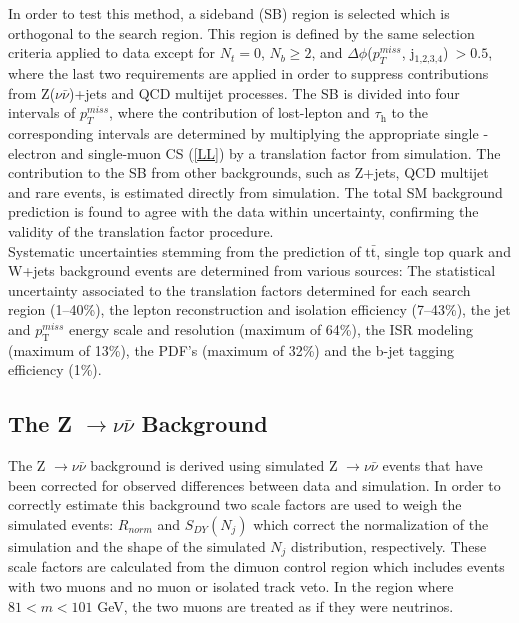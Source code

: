 In order to test this method, a sideband (SB) region is selected which is orthogonal to the search region. This region is defined by the same selection criteria applied to data except for $N_t = 0$, $N_b \geq 2$, and $\Delta\phi$($p_{T}^{miss}$,  j$_\text{1,2,3,4}$)$~> 0.5$, where the last two requirements are applied in order to suppress contributions from Z($\nu\bar{\nu}$)+jets and QCD multijet processes. The SB is divided into four intervals of $p_{T}^{miss}$, where the contribution of lost-lepton and $\tau_\text{h}$ to the corresponding intervals are determined by multiplying the appropriate single -electron and single-muon CS (\autoref{LL}) by a translation factor from simulation. The contribution to the SB from other backgrounds, such as Z+jets, QCD multijet and rare events, is estimated directly from simulation. The total SM background prediction is found to agree with the data within uncertainty, confirming the validity of the translation factor procedure.\\

Systematic uncertainties stemming from the prediction of t$\bar{\text{t}}$, single top quark and W+jets background events are determined from various sources: The statistical uncertainty associated to the translation factors determined for each search region (1--40\%), the lepton reconstruction and isolation efficiency (7--43\%), the jet and $p_{\text{T}}^{miss}$ energy scale and resolution (maximum of 64\%), the ISR modeling (maximum of 13\%), the PDF's (maximum of 32\%) and the b-jet tagging efficiency (1\%).

\subsection{The Z $\rightarrow\nu\bar{\nu}$ Background}\label{ZnunuSection}

The Z $\rightarrow\nu\bar{\nu}$ background is derived using simulated Z $\rightarrow\nu\bar{\nu}$ events that have been corrected for observed differences between data and simulation. In order to correctly estimate this background two scale factors are used to weigh the simulated events: $R_{norm}$ and $S_{DY}( N_j)$  which correct the normalization of the simulation and the shape of the simulated $N_j$ distribution, respectively. These scale factors are calculated from the dimuon control region which includes events with two muons and no muon or isolated track veto. In the region where $81 < m < 101$ GeV, the two muons are treated as if they were neutrinos.\\

